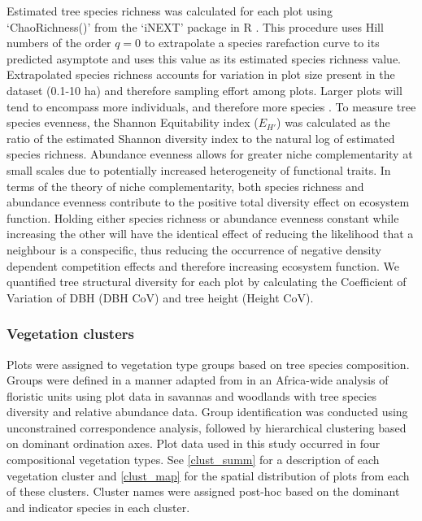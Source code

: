 \documentclass[11pt,a4paper]{article}
\begin{document}
Estimated tree species richness was calculated for each plot using `ChaoRichness()' from the `iNEXT' package in R \citep{Hsieh2016}. This procedure uses Hill numbers of the order $q=0$ \citep{Jost2006} to extrapolate a species rarefaction curve to its predicted asymptote and uses this value as its estimated species richness value. Extrapolated species richness accounts for variation in plot size present in the dataset (0.1-10 ha) and therefore sampling effort among plots. Larger plots will tend to encompass more individuals, and therefore more species \citep{Dengler2009}. To measure tree species evenness, the Shannon Equitability index ($E_{H'}$) \citep{Smith1996} was calculated as the ratio of the estimated Shannon diversity index to the natural log of estimated species richness. Abundance evenness allows for greater niche complementarity at small scales due to potentially increased heterogeneity of functional traits. In terms of the theory of niche complementarity, both species richness and abundance evenness contribute to the positive total diversity effect on ecosystem function. Holding either species richness or abundance evenness constant while increasing the other will have the identical effect of reducing the likelihood that a neighbour is a conspecific, thus reducing the occurrence of negative density dependent competition effects and therefore increasing ecosystem function. We quantified tree structural diversity for each plot by calculating the Coefficient of Variation of DBH (DBH CoV) and tree height (Height CoV). 

\subsubsection{Vegetation clusters}

Plots were assigned to vegetation type groups based on tree species composition. Groups were defined in a manner adapted from \citet{Fayolle2018} in an Africa-wide analysis of floristic units using plot data in savannas and woodlands with tree species diversity and relative abundance data. Group identification was conducted using unconstrained correspondence analysis, followed by hierarchical clustering based on dominant ordination axes. Plot data used in this study occurred in four compositional vegetation types. See \autoref{clust_summ} for a description of each vegetation cluster and \autoref{clust_map} for the spatial distribution of plots from each of these clusters. Cluster names were assigned post-hoc based on the dominant and indicator species in each cluster.
\end{document}
